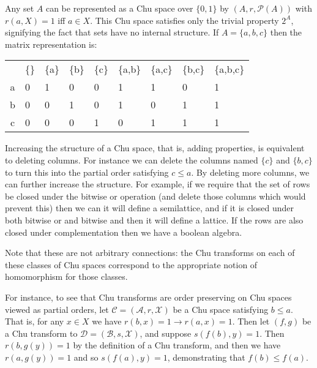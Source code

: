 \documentclass[12pt]{article}
\begin{document}
Any set $A$ can be represented as a Chu space over $\{0,1\}$ by $(A,r,\mathcal{P}(A))$ with $r(a,X)=1$ iff $a\in X$.  This Chu space satisfies only the trivial property $2^A$, signifying the fact that sets have no internal structure.  If $A=\{a,b,c\}$ then the matrix representation is:

\begin{tabular}{c|llllllll}
&\{\}&\{a\}&\{b\}&\{c\}&\{a,b\}&\{a,c\}&\{b,c\}&\{a,b,c\}\\
a&0&1&0&0&1&1&0&1\\
b&0&0&1&0&1&0&1&1\\
c&0&0&0&1&0&1&1&1
\end{tabular}

Increasing the structure of a Chu space, that is, adding properties, is equivalent to deleting columns.  For instance we can delete the columns named $\{c\}$ and $\{b,c\}$ to turn this into the partial order satisfying $c\leq a$.  By deleting more columns, we can further increase the structure.  For example, if we require that the set of rows be closed under the bitwise or operation (and delete those columns which would prevent this) then we can it will define a semilattice, and if it is closed under both bitwise or and bitwise and then it will define a lattice.  If the rows are also closed under complementation then we have a boolean algebra.

Note that these are not arbitrary connections: the Chu transforms on each of these classes of Chu spaces correspond to the appropriate notion of homomorphism for those classes.

For instance, to see that Chu transforms are order preserving on Chu spaces viewed as partial orders, let $\mathcal{C}=(\mathcal{A},r,\mathcal{X})$ be a Chu space satisfying $b\leq a$.  That is, for any $x\in X$ we have $r(b,x)=1\rightarrow r(a,x)=1$.  Then let $(f,g)$ be a Chu transform to $\mathcal{D}=(\mathcal{B},s,\mathcal{X})$, and suppose $s(f(b),y)=1$.  Then $r(b,g(y))=1$ by the definition of a Chu transform, and then we have $r(a,g(y))=1$ and so $s(f(a),y)=1$, demonstrating that $f(b)\leq f(a)$.
\end{document}
